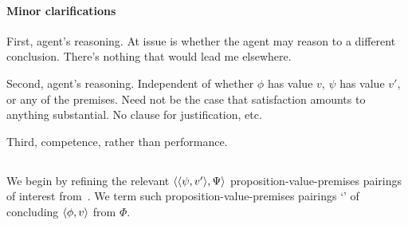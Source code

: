 \paragraph*{Minor clarifications}

\begin{note}
  First, agent's reasoning.
  At issue is whether the agent may reason to a different conclusion.
  There's nothing that would lead me elsewhere.

  Second, agent's reasoning.
  Independent of whether \(\phi\) has value \(v\), \(\psi\) has value \(v'\), or any of the premises.
  Need not be the case that satisfaction amounts to anything substantial.
  No clause for justification, etc.

  Third, competence, rather than performance.
\end{note}

\subsection{}

\begin{note}
  We begin by refining the relevant \(\langle \langle \psi, v' \rangle, \Psi \rangle\) proposition-value-premises pairings of interest from~\qzS{}.
  We term such proposition-value-premises pairings `' of concluding \(\langle \phi, v \rangle\) from \(\Phi\).
\end{note}


